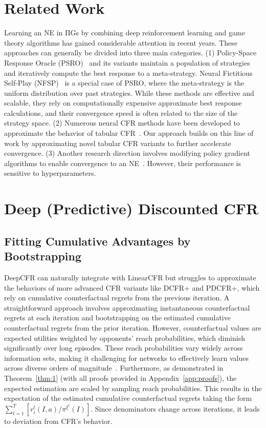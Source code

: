 \documentclass[letterpaper]{article} %
\begin{document}
\section{Related Work}

Learning an NE in IIGs by combining deep reinforcement learning and game theory algorithms has gained considerable attention in recent years.
These approaches can generally be divided into three main categories. (1) Policy-Space Response Oracle (PSRO)~\cite{lanctot2017unified} and its variants maintain a population of strategies and iteratively compute the best response to a meta-strategy. Neural Fictitious Self-Play (NFSP)~\cite{heinrich2016deep} is a special case of PSRO, where the meta-strategy is the uniform distribution over past strategies. While these methods are effective and scalable, they rely on computationally expensive approximate best response calculations, and their convergence speed is often related to the size of the strategy space.
(2) Numerous neural CFR methods have been developed to approximate the behavior of tabular CFR~\cite{brown2019deep,lidouble,gruslys2020advantage,steinberger2020dream,liu2022model,meng2023efficient,ESCHER}. Our approach builds on this line of work by approximating novel tabular CFR variants to further accelerate convergence. (3) Another research direction involves modifying policy gradient algorithms to enable convergence to an NE~\cite{srinivasan2018actor,lockhart2019computing,hennes2020neural,fu2021actor}. However, their performance is sensitive to hyperparameters.

\section{Deep (Predictive) Discounted CFR}

\subsection{Fitting Cumulative Advantages by Bootstrapping}

DeepCFR can naturally integrate with LinearCFR but struggles to approximate the behaviors of more advanced CFR variants like DCFR+ and PDCFR+, which rely on cumulative counterfactual regrets from the previous iteration. A straightforward approach involves approximating instantaneous counterfactual regrets at each iteration and bootstrapping on the estimated cumulative counterfactual regrets from the prior iteration. However, counterfactual values are expected utilities weighted by opponents’ reach probabilities, which diminish significantly over long episodes. These reach probabilities vary widely across information sets, making it challenging for networks to effectively learn values across diverse orders of magnitude~\cite{van2016learning}. Furthermore, as demonstrated in Theorem~\ref{thm:1} (with all proofs provided in Appendix~\ref{app:proofs}), the expected estimation are scaled by sampling reach probabilities. This results in the expectation of the estimated cumulative counterfactual regrets taking the form $\sum_{t=1}^{T}\left[r_i^t(I, a)/\pi^{\xi^t}(I)\right]$. Since denominators change across iterations, it leads to deviation from CFR's behavior. 
\end{document}
